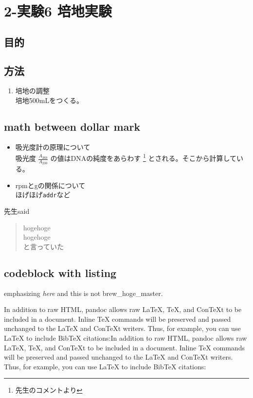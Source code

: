 \section{2-実験6 培地実験}\label{6-}

\subsection{目的}

\subsection{方法}

\begin{enumerate}
\tightlist
\item
  培地の調整\\
  培地500mLをつくる。
\end{enumerate}

\subsection{math between dollar mark}\label{math-between-dollar-mark}

\begin{itemize}
\item
  吸光度計の原理について\\
  吸光度 \(\frac{A_{260}}{A_{230}}\) の値はDNAの純度をあらわす
  \footnote{先生のコメントより} とされる。そこから計算している。
\item
  rpmとgの関係について\\
  ほげほげ\lstinline!addr!など
\end{itemize}

先生said

\begin{quote}
hogehoge\\
hogehoge\\
と言っていた
\end{quote}

\subsection{codeblock with listing}\label{codeblock-with-listing}

emphasizing \emph{here} and this is not brew\_hoge\_master.

In addition to raw HTML, pandoc allows raw LaTeX, TeX, and ConTeXt to be
included in a document. Inline TeX commands will be preserved and passed
unchanged to the LaTeX and ConTeXt writers. Thus, for example, you can
use LaTeX to include BibTeX citations:In addition to raw HTML, pandoc
allows raw LaTeX, TeX, and ConTeXt to be included in a document. Inline
TeX commands will be preserved and passed unchanged to the LaTeX and
ConTeXt writers. Thus, for example, you can use LaTeX to include BibTeX
citations:

